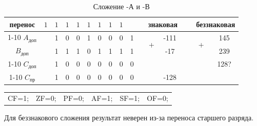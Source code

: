 \begin{table}[H]
    \centering
    \caption{Сложение -А и -В}
    \begin{tabular}{c|cc|cccccccp{1cm}ccp{0.5cm}cc}
		\small перенос & $1$ & $1$ & $1$ & $1$ & $1$ & $1$ & $1$ & $1$ & & & \multicolumn{2}{c}{знаковая} & \  & \multicolumn{2}{c}{беззнаковая}  \\
		\cline{1-10} \cline{12-13} \cline{15-16}
		$A_{\text{доп}}$ & & 1 & 0 & 0 & 1 & 0 & 0 & 0 & 1 & & \multirow{2}{*}{+} & -111 & \  & \multirow{2}{*}{+} & 145   \\
		$B_{\text{доп}}$ & & 1 & 1 & 1 & 0 & 1 & 1 & 1 & 1 & & & -17 & \  &  & 239\\
		\cline{1-10} \cline{12-13} \cline{15-16}
		$C_{\text{доп}}$ & & 1 & 0 & 0 & 0 & 0 & 0 & 0 & 0 & & & & \  &  & 128? \\
		\cline{1-10} \cline{12-13} \cline{15-16}
		$C_{\text{пр}}$ & & 1 & 0 & 0 & 0 & 0 & 0 & 0 & 0 & & & -128 & \  &  & \\
    \end{tabular}
\end{table}

\begin{table}[H]
    \centering
    \begin{tabular}{cccccc}
        CF=1; & ZF=0; & PF=0; & AF=1; & SF=1; & OF=0;
    \end{tabular}
\end{table}

Для беззнакового сложения результат неверен из-за переноса старшего разряда.
